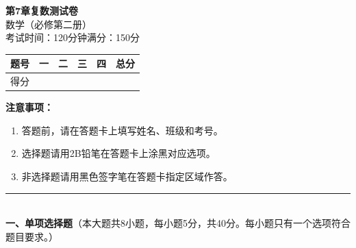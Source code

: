 \documentclass[12pt, a4paper]{ctexart}
\begin{document}
\begin{center}
{\Large\bfseries 第7章\quad 复数\quad 测试卷}\\[6pt]
{\normalsize 数学（必修第二册）}\\[4pt]
{\small 考试时间：120分钟\quad 满分：150分}
\end{center}

\vspace{2pt}
\begin{center}
\begin{tabular}{|c|c|c|c|c|}
\hline
题号 & 一 & 二 & 三 & 四 & 总分 \\ \hline
得分 & & & & & \\ \hline
\end{tabular}
\end{center}
\vspace{4pt}

\noindent\textbf{注意事项：}
\begin{enumerate}[leftmargin=2em]
  \item 答题前，请在答题卡上填写姓名、班级和考号。
  \item 选择题请用2B铅笔在答题卡上涂黑对应选项。
  \item 非选择题请用黑色签字笔在答题卡指定区域作答。
\end{enumerate}

\vspace{6pt}

\noindent\rule{\textwidth}{0.4pt}\\[2pt]
{\large\bfseries 一、单项选择题}（本大题共8小题，每小题5分，共40分。每小题只有一个选项符合题目要求。）

\vspace{6pt}
\end{document}
